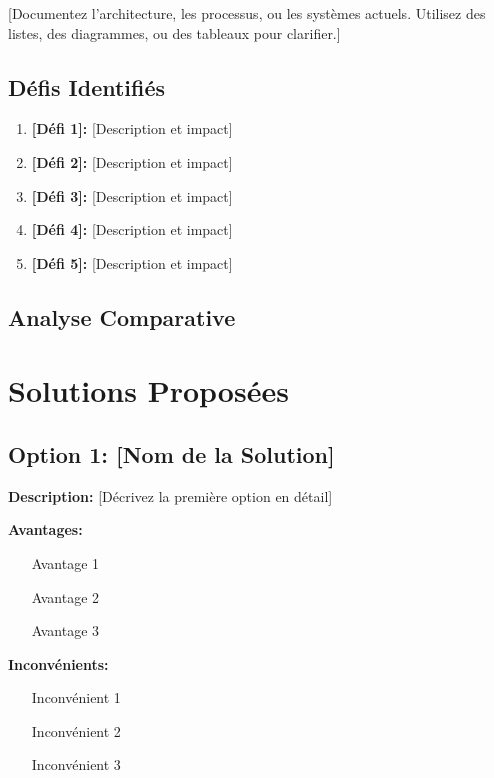 [Documentez l'architecture, les processus, ou les systèmes actuels. Utilisez des listes, des diagrammes, ou des tableaux pour clarifier.]

\subsection{Défis Identifiés}

\begin{enumerate}
\item \textbf{[Défi 1]:} [Description et impact]
\item \textbf{[Défi 2]:} [Description et impact]
\item \textbf{[Défi 3]:} [Description et impact]
\item \textbf{[Défi 4]:} [Description et impact]
\item \textbf{[Défi 5]:} [Description et impact]
\end{enumerate}

\subsection{Analyse Comparative}


\section{Solutions Proposées}

\subsection{Option 1: [Nom de la Solution]}

\textbf{Description:}
[Décrivez la première option en détail]

\textbf{Avantages:}
\begin{itemize}
\item [Avantage 1]
\item [Avantage 2]
\item [Avantage 3]
\end{itemize}

\textbf{Inconvénients:}
\begin{itemize}
\item [Inconvénient 1]
\item [Inconvénient 2]
\item [Inconvénient 3]
\end{itemize}

